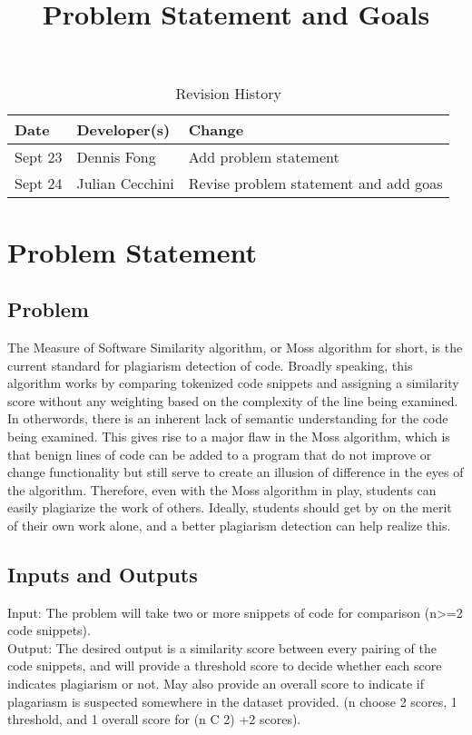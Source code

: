 \documentclass{article}
\title{Problem Statement and Goals\\\progname}
\author{\authname}
\date{}
\begin{document}
\maketitle

\begin{table}[hp]
\caption{Revision History} \label{TblRevisionHistory}
\begin{tabularx}{\textwidth}{llX}
\toprule
\textbf{Date} & \textbf{Developer(s)} & \textbf{Change}\\
\midrule
Sept 23 & Dennis Fong & Add problem statement\\
Sept 24 & Julian Cecchini & Revise problem statement and add goas\\
\bottomrule
\end{tabularx}
\end{table}

\section{Problem Statement}



\subsection{Problem}
The Measure of Software Similarity algorithm, or Moss algorithm for short, is the current standard for plagiarism detection of code. Broadly speaking, this algorithm works by comparing tokenized code snippets and assigning a similarity score without any weighting based on the complexity of the line being examined. In otherwords, there is an inherent lack of semantic understanding for the code being examined. This gives rise to a major flaw in the Moss algorithm, which is that benign lines of code can be added to a program that do not improve or change functionality but still serve to create an illusion of difference in the eyes of the algorithm. Therefore, even with the Moss algorithm in play, students can easily plagiarize the work of others. Ideally, students should get by on the merit of their own work alone, and a better plagiarism detection can help realize this.

\subsection{Inputs and Outputs}
Input: The problem will take two or more snippets of code for comparison (n>=2 code snippets). \\
Output: The desired output is a similarity score between every pairing of the code snippets, and will provide a threshold score to decide whether each score indicates plagiarism or not. May also provide an overall score to indicate if plagariasm is suspected somewhere in the dataset provided. (n choose 2 scores, 1 threshold, and 1 overall score for (n C 2) +2 scores). 
\end{document}
